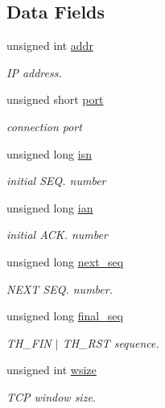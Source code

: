\subsection*{Data Fields}
\begin{DoxyCompactItemize}
\item 
unsigned int \hyperlink{structntoh__tcp__peer__t_ab36863a07751ac73459d46b677c33b57}{addr}
\begin{DoxyCompactList}\small\item\em I\-P address. \end{DoxyCompactList}\item 
unsigned short \hyperlink{structntoh__tcp__peer__t_ab85ff85aa1f60f4a1c1ca1225a9dad06}{port}
\begin{DoxyCompactList}\small\item\em connection port \end{DoxyCompactList}\item 
unsigned long \hyperlink{structntoh__tcp__peer__t_a9e6dafb622805bf2612b302c10f18ba5}{isn}
\begin{DoxyCompactList}\small\item\em initial S\-E\-Q. number \end{DoxyCompactList}\item 
unsigned long \hyperlink{structntoh__tcp__peer__t_acfab4beb8833b2e45a3d02b1b8eb2ae3}{ian}
\begin{DoxyCompactList}\small\item\em initial A\-C\-K. number \end{DoxyCompactList}\item 
unsigned long \hyperlink{structntoh__tcp__peer__t_a8293c38954155f30a30958c8e8100f0b}{next\-\_\-seq}
\begin{DoxyCompactList}\small\item\em N\-E\-X\-T S\-E\-Q. number. \end{DoxyCompactList}\item 
unsigned long \hyperlink{structntoh__tcp__peer__t_a9ed11c1f20c424d3a4edf704ecf07d93}{final\-\_\-seq}
\begin{DoxyCompactList}\small\item\em T\-H\-\_\-\-F\-I\-N $\vert$ T\-H\-\_\-\-R\-S\-T sequence. \end{DoxyCompactList}\item 
unsigned int \hyperlink{structntoh__tcp__peer__t_a2e4250265d88bafcbc4bdad73639c2a7}{wsize}
\begin{DoxyCompactList}\small\item\em T\-C\-P window size. \end{DoxyCompactList}\item 

\end{DoxyCompactItemize}
